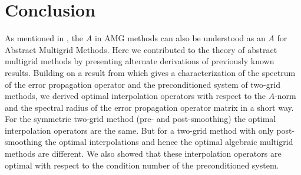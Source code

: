 \documentclass[final]{siamltex}
\numberwithin{equation}{section}
\begin{document}
\section{Conclusion}
As mentioned in \cite{XuZ17}, the  $A$ in AMG methods can also be understood as
an
$A$
for
Abstract 
Multigrid Methods. Here  we contributed to the  theory of  
abstract multigrid methods by presenting alternate derivations of previously
known results. Building on a  result from \cite{GarKN18} which gives a
characterization of the spectrum of the
error propagation operator and the preconditioned system of two-grid methods,
we derived optimal interpolation operators with respect  to the $A$-norm and
the spectral radius of the  error propagation operator matrix in a
short way. For the symmetric two-grid method (pre- and  post-smoothing) the
optimal interpolation operators are  the same. But for a two-grid
method with only post-smoothing
the optimal interpolations and hence the optimal algebraic multigrid
methods are different. We also showed that these interpolation operators
are optimal  with respect to the condition number of the preconditioned system.


%

\end{document}
